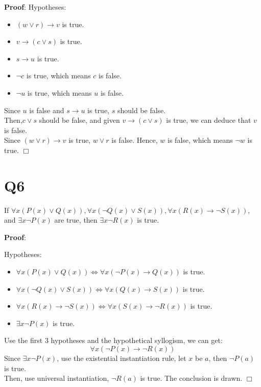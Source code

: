 \documentclass[11pt]{article}
\newenvironment{qparts}{\begin{enumerate}[{(}a{)}]}{\end{enumerate}}
\def\endproofmark{$\Box$}
\newenvironment{proof}{\par{\bf Proof}:}{\endproofmark\smallskip}
\begin{document}
\begin{qparts}
\begin{proof}
        Hypotheses:
        \begin{itemize}
            
            \item $(w \lor r)\to v$ is true.
            \item $v \to (c \lor s)$ is true.
            \item $s \to u$ is true.
            \item $\lnot c$ is true, which means $c$ is false.
            \item $\lnot u$ is true, which means $u$ is false.
        \end{itemize}
        Since $u$ is false and $s \to u$ is true, $s$ should be false.\\
        Then,$c \lor s$ should be false, and given $v \to (c \lor s)$ is true,
        we can deduce that $v$ is false.\\
        Since $(w \lor r)\to v$ is true, $w \lor r$ is false. Hence, $w$ is false, which means $\lnot w$ is true.
    \end{proof} 
\end{qparts}

\section*{Q6}
If $\forall x(P(x)\lor Q(x)),
\forall x(\lnot Q(x)\lor S(x)),
\forall x(R(x)\to \lnot S(x))$, 
and $\exists x\lnot P(x)$ are true, 
then $\exists x\lnot R(x)$ is true.
\begin{proof}
    
    Hypotheses:
    \begin{itemize}
        
        \item $\forall x(P(x)\lor Q(x))\iff\forall x(\lnot P(x)\to Q(x))$ is true.
        \item $\forall x(\lnot Q(x)\lor S(x))\iff\forall x(Q(x)\to S(x))$ is true.
        \item $\forall x(R(x)\to \lnot S(x))\iff\forall x(S(x)\to \lnot R(x))$ is true.
        \item $\exists x\lnot P(x)$ is true.
    \end{itemize}
    Use the first 3 hypotheses and the hypothetical syllogism, we can get:
    \begin{equation*}
      \forall x(\lnot P(x)\to \lnot R(x))
    \end{equation*}
    Since $\exists x\lnot P(x)$, use the existential instantiation rule, let $x$
    be $a$, then $\lnot P(a)$ is true.\\
    Then, use universal instantiation, $\lnot R(a)$ is true. 
    The conclusion is drawn.
\end{proof}
\end{document}
